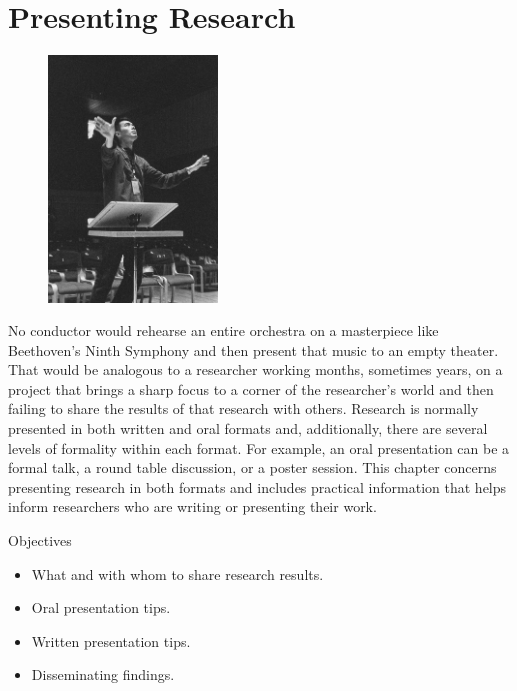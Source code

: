\chapter{Presenting Research}

\begin{figure}
	\centering
	\includegraphics[width=0.4\textwidth]{gfx/15-conduct} 
\end{figure}

No conductor would rehearse an entire orchestra on a masterpiece like Beethoven's Ninth Symphony and then present that music to an empty theater. That would be analogous to a researcher working months, sometimes years, on a project that brings a sharp focus to a corner of the researcher's world and then failing to share the results of that research with others. Research is normally presented in both written and oral formats and, additionally, there are several levels of formality within each format. For example, an oral presentation can be a formal talk, a round table discussion, or a poster session. This chapter concerns presenting research in both formats and includes practical information that helps inform researchers who are writing or presenting their work.

\begin{center}
	\begin{objbox}{Objectives}
		\begin{itemize}
			\setlength{\itemsep}{0pt}
			\setlength{\parskip}{0pt}
			\setlength{\parsep}{0pt}
			
			\item What and with whom to share research results.
			\item Oral presentation tips.
			\item Written presentation tips.
			\item Disseminating findings.
		\end{itemize}
	\end{objbox}
\end{center}

